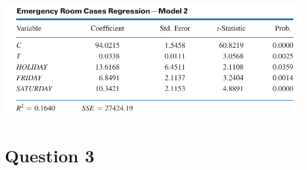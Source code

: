 \documentclass[xcolor={dvipsnames}]{beamer}
\begin{document}
\begin{frame}[allowframebreaks]{7.2}
\begin{itemize}
	\end{itemize}

	\includegraphics{TableMoonReg2.png}
	
\end{frame}


	\section{Question 3}
\end{document}
